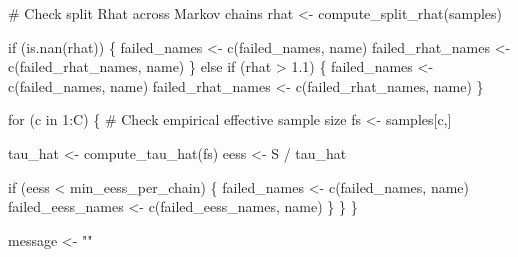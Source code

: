 \documentclass[
  letterpaper,
  DIV=11,
  numbers=noendperiod]{scrartcl}
\newenvironment{Shaded}{\begin{snugshade}}{\end{snugshade}}
\newcommand{\CommentTok}[1]{\textcolor[rgb]{0.37,0.37,0.37}{#1}}
\newcommand{\ControlFlowTok}[1]{\textcolor[rgb]{0.00,0.23,0.31}{#1}}
\newcommand{\DecValTok}[1]{\textcolor[rgb]{0.68,0.00,0.00}{#1}}
\newcommand{\FloatTok}[1]{\textcolor[rgb]{0.68,0.00,0.00}{#1}}
\newcommand{\FunctionTok}[1]{\textcolor[rgb]{0.28,0.35,0.67}{#1}}
\newcommand{\NormalTok}[1]{\textcolor[rgb]{0.00,0.23,0.31}{#1}}
\newcommand{\OtherTok}[1]{\textcolor[rgb]{0.00,0.23,0.31}{#1}}
\newcommand{\SpecialCharTok}[1]{\textcolor[rgb]{0.37,0.37,0.37}{#1}}
\newcommand{\StringTok}[1]{\textcolor[rgb]{0.13,0.47,0.30}{#1}}
\begin{document}
\begin{Shaded}
\begin{Highlighting}[]
    \CommentTok{\# Check split Rhat across Markov chains}
\NormalTok{    rhat }\OtherTok{\textless{}{-}} \FunctionTok{compute\_split\_rhat}\NormalTok{(samples)}

    \ControlFlowTok{if}\NormalTok{ (}\FunctionTok{is.nan}\NormalTok{(rhat)) \{}
\NormalTok{      failed\_names }\OtherTok{\textless{}{-}} \FunctionTok{c}\NormalTok{(failed\_names, name)}
\NormalTok{      failed\_rhat\_names }\OtherTok{\textless{}{-}} \FunctionTok{c}\NormalTok{(failed\_rhat\_names, name)}
\NormalTok{    \} }\ControlFlowTok{else} \ControlFlowTok{if}\NormalTok{ (rhat }\SpecialCharTok{\textgreater{}} \FloatTok{1.1}\NormalTok{) \{}
\NormalTok{      failed\_names }\OtherTok{\textless{}{-}} \FunctionTok{c}\NormalTok{(failed\_names, name)}
\NormalTok{      failed\_rhat\_names }\OtherTok{\textless{}{-}} \FunctionTok{c}\NormalTok{(failed\_rhat\_names, name)}
\NormalTok{    \}}

    \ControlFlowTok{for}\NormalTok{ (c }\ControlFlowTok{in} \DecValTok{1}\SpecialCharTok{:}\NormalTok{C) \{}
      \CommentTok{\# Check empirical effective sample size}
\NormalTok{      fs }\OtherTok{\textless{}{-}}\NormalTok{ samples[c,]}
      
\NormalTok{      tau\_hat }\OtherTok{\textless{}{-}} \FunctionTok{compute\_tau\_hat}\NormalTok{(fs)}
\NormalTok{      eess }\OtherTok{\textless{}{-}}\NormalTok{ S }\SpecialCharTok{/}\NormalTok{ tau\_hat}
      
      \ControlFlowTok{if}\NormalTok{ (eess }\SpecialCharTok{\textless{}}\NormalTok{ min\_eess\_per\_chain) \{}
\NormalTok{        failed\_names }\OtherTok{\textless{}{-}} \FunctionTok{c}\NormalTok{(failed\_names, name)}
\NormalTok{        failed\_eess\_names }\OtherTok{\textless{}{-}} \FunctionTok{c}\NormalTok{(failed\_eess\_names, name)}
\NormalTok{      \}}
\NormalTok{    \}}
\NormalTok{  \}}
  
\NormalTok{  message }\OtherTok{\textless{}{-}} \StringTok{""}
  

\end{Highlighting}
\end{Shaded}
\end{document}
